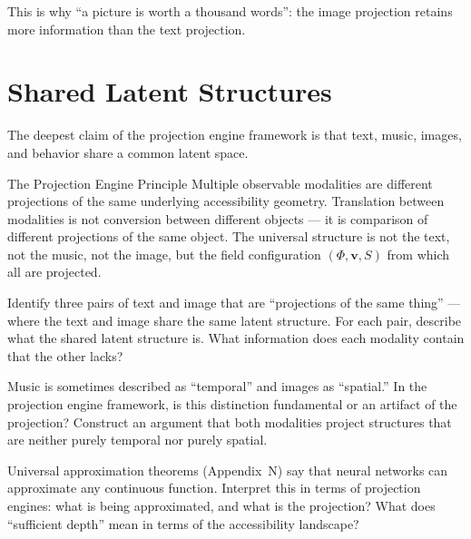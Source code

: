 This is why ``a picture is worth a thousand words'': the image projection
retains more information than the text projection.

\section{Shared Latent Structures}

The deepest claim of the projection engine framework is that text,
music, images, and behavior share a common latent space.

\begin{namedthm}{The Projection Engine Principle}
  Multiple observable modalities are different projections of the same
  underlying accessibility geometry. Translation between modalities is
  not conversion between different objects — it is comparison of different
  projections of the same object. The universal structure is not the
  text, not the music, not the image, but the field configuration
  $(\Phi, \mathbf{v}, S)$ from which all are projected.
\end{namedthm}

\begin{exercise}
  Identify three pairs of text and image that are ``projections of the
  same thing'' — where the text and image share the same latent structure.
  For each pair, describe what the shared latent structure is.
  What information does each modality contain that the other lacks?
\end{exercise}

\begin{exercise}
  Music is sometimes described as ``temporal'' and images as ``spatial.''
  In the projection engine framework, is this distinction fundamental or
  an artifact of the projection? Construct an argument that both modalities
  project structures that are neither purely temporal nor purely spatial.
\end{exercise}

\begin{exercise}[title={Technical}]
  Universal approximation theorems (Appendix~N) say that neural networks
  can approximate any continuous function. Interpret this in terms of
  projection engines: what is being approximated, and what is the
  projection? What does ``sufficient depth'' mean in terms of the
  accessibility landscape?
\end{exercise}

